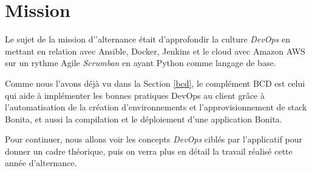 \section{Mission}
Le sujet de la mission d’’alternance était d'approfondir la culture \emph{DevOps} en mettant en relation avec Ansible, Docker, Jenkins et le cloud avec Amazon AWS sur un rythme Agile \textit{Scrumban} en ayant Python comme langage de base.

Comme nous l’avons déjà vu dans la Section \ref{bcd}, le complément BCD est celui qui aide à implémenter les bonnes pratiques DevOps au client grâce à l'automatisation de la création d'environnements et l'approvisionnement de stack Bonita, et aussi la compilation et le déploiement d'une application Bonita.

Pour continuer, nous allons voir les concepts \emph{DevOps} ciblés par l'applicatif pour donner un cadre théorique, puis on verra plus en détail la travail réalisé cette année d'alternance.














